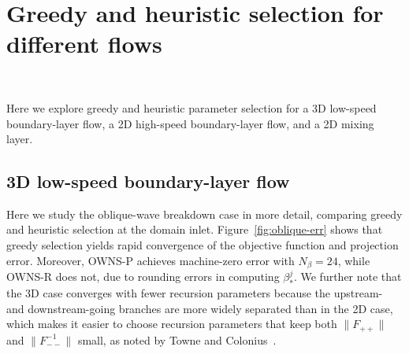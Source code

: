 \section{Greedy and heuristic selection for different flows}~\label{app:ComparisonFlows}

Here we explore greedy and heuristic parameter selection for a 3D low-speed boundary-layer flow, a 2D high-speed boundary-layer flow, and a 2D mixing layer.


\subsection{3D low-speed boundary-layer flow}

Here we study the oblique-wave breakdown case in more detail, comparing greedy and heuristic selection at the domain inlet. Figure~\ref{fig:oblique-err} shows that greedy selection yields rapid convergence of the objective function and projection error. Moreover, OWNS-P achieves machine-zero error with $N_\beta=24$, while OWNS-R does not, due to rounding errors in computing $\beta_*^j$. We further note that the 3D case converges with fewer recursion parameters because the upstream- and downstream-going branches are more widely separated than in the 2D case, which makes it easier to choose recursion parameters that keep both $\|F_{++}\|$ and $\|F_{--}^{-1}\|$ small, as noted by Towne and Colonius~\cite{Towne_2015_OWNS-O}.


